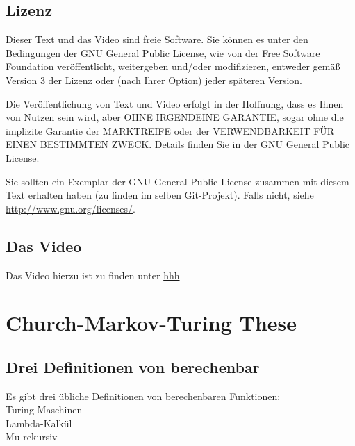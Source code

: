 \documentclass[a4paper]{amsart}
\theoremstyle{definition}
\begin{document}
\subsection*{Lizenz}
Dieser Text und das Video sind freie Software. Sie können es unter den Bedingungen der
GNU General Public License, wie von der Free Software Foundation veröffentlicht, weitergeben
und/oder modifizieren, entweder gemäß Version 3 der Lizenz oder (nach Ihrer Option) jeder späteren Version.

Die Veröffentlichung von Text und Video erfolgt in der Hoffnung, dass es Ihnen von Nutzen sein wird,
aber OHNE IRGENDEINE GARANTIE, sogar ohne die implizite Garantie der MARKTREIFE oder der
VERWENDBARKEIT FÜR EINEN BESTIMMTEN ZWECK. Details finden Sie in der GNU General Public License.

Sie sollten ein Exemplar der GNU General Public License zusammen mit diesem Text erhalten haben
(zu finden im selben Git-Projekt).
Falls nicht, siehe \url{http://www.gnu.org/licenses/}.

\subsection*{Das Video}
Das Video hierzu ist zu finden unter
{\tiny
   \url{hhh}
}

\section{Church-Markov-Turing These}
\subsection{Drei Definitionen von berechenbar}
Es gibt drei übliche Definitionen von berechenbaren Funktionen:\\
Turing-Maschinen\\
Lambda-Kalkül\\
Mu-rekursiv
\end{document}
